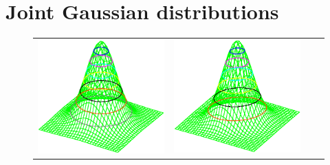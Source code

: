 %
%
%

\section{Joint Gaussian distributions}
\begin{figure}
\begin{tabular}{*{4}{c}}
  \includegraphics[width=\tw/4-5mm,clip=true]{../common/normxy_00.eps} &
  \includegraphics[width=\tw/4-5mm,clip=true]{../common/normxy_50.eps} &

\end{tabular}
\end{figure}
